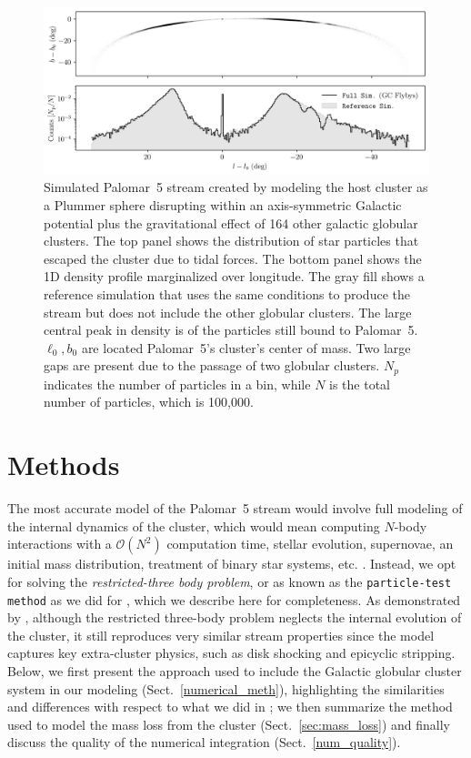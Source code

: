 \documentclass{aa}
\begin{document}
  \begin{figure}
    \centering
    \includegraphics[width=\linewidth]{stream_on_sky_Pal5_monte-carlo-009_pouliasis2017pii-GCNBody_pouliasis2017pii.png}
    \caption{Simulated Palomar~5 stream created by modeling the host cluster as a Plummer sphere disrupting within an axis-symmetric Galactic potential plus the gravitational effect of 164 other galactic globular clusters. The top panel shows the distribution of star particles that escaped the cluster due to tidal forces. The bottom panel shows the 1D density profile marginalized over longitude. The gray fill shows a reference simulation that uses the same conditions to produce the stream but does not include the other globular clusters. The large central peak in density is of the particles still bound to Palomar~5. $\ell_0,b_0$ are located Palomar~5's cluster's center of mass. Two large gaps are present due to the passage of two globular clusters. $N_p$ indicates the number of particles in a bin, while $N$ is the total number of particles, which is 100,000.}
    \label{fig:stream_on_sky}
    \end{figure}


\section{Methods}
  The most accurate model of the Palomar~5 stream would involve full modeling of the internal dynamics of the cluster, which would mean computing $N$-body interactions with a $\mathcal{O}(N^2)$ computation time, stellar evolution, supernovae, an initial mass distribution, treatment of binary star systems, etc. \citep[for such an example, see][]{2021NatAs...5..957G, 2016MNRAS.458.1450W}. Instead, we opt for solving the \textit{restricted-three body problem}, or as known as the \texttt{particle-test method} as we did for \citet{2023A&A...673A..44F}, which we describe here for completeness. As demonstrated by \citet{2012A&A...546L...7M}, although the restricted three-body problem neglects the internal evolution of the cluster, it still reproduces very similar stream properties since the model captures key extra-cluster physics, such as disk shocking and epicyclic stripping.\\
  Below, we first present the approach used to include the Galactic globular cluster system in our modeling (Sect.~\ref{numerical_meth}), highlighting the similarities and differences with respect to what we did in \citet{2023A&A...673A..44F}; we then summarize the method used to model the mass loss from the cluster (Sect.~\ref{sec:mass_loss}) and finally discuss the quality of the numerical integration (Sect.~\ref{num_quality}). 
\end{document}
